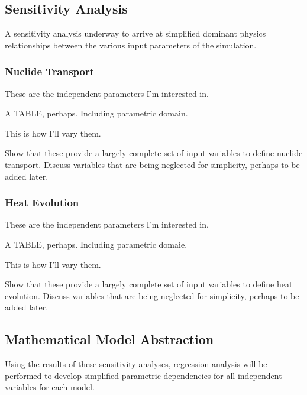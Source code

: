 





\subsection{Sensitivity Analysis}

A sensitivity analysis underway to arrive at simplified dominant physics 
relationships between the various input parameters of the simulation. 

\subsubsection{Nuclide Transport}

These are the independent parameters I'm interested in.

A TABLE, perhaps. Including parametric domain.

This is how I'll vary them.

Show that these provide a largely complete set of input variables to define 
nuclide transport. Discuss variables that are being neglected for simplicity, 
perhaps to be added later. 

\subsubsection{Heat Evolution}

These are the independent parameters I'm interested in.

A TABLE, perhaps. Including parametric domaie.

This is how I'll vary them.

Show that these provide a largely complete set of input variables to define heat 
evolution. Discuss variables that are being neglected for simplicity, perhaps to 
be added later. 

\subsection{Mathematical Model Abstraction}

Using the results of these sensitivity analyses, regression analysis will be 
performed to develop simplified parametric dependencies for all independent 
variables for each model. 

